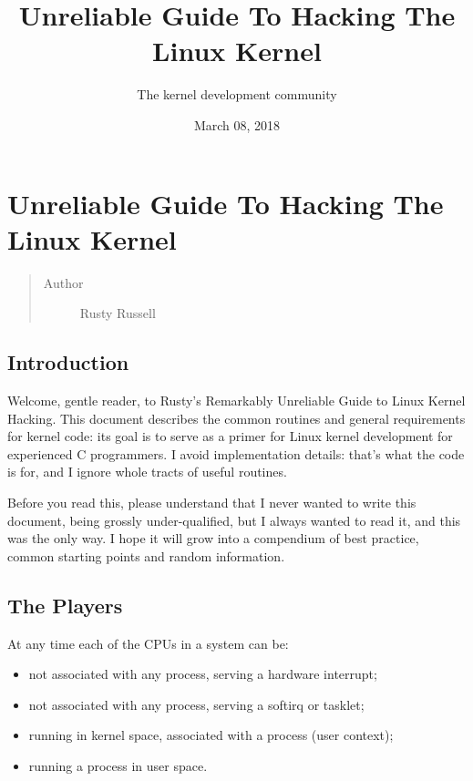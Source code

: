 \documentclass[a4paper,8pt,english]{sphinxmanual}
\title{Unreliable Guide To Hacking The Linux Kernel}
\date{March 08, 2018}
\author{The kernel development community}
\begin{document}
\maketitle
\tableofcontents
{}\label{kernel-hacking/index::doc}



\chapter{Unreliable Guide To Hacking The Linux Kernel}
\label{kernel-hacking/hacking:kernel-hacking-guides}\label{kernel-hacking/hacking::doc}\label{kernel-hacking/hacking:unreliable-guide-to-hacking-the-linux-kernel}\begin{quote}\begin{description}
\item[{Author}] \leavevmode
Rusty Russell

\end{description}\end{quote}


\section{Introduction}
\label{kernel-hacking/hacking:introduction}
Welcome, gentle reader, to Rusty's Remarkably Unreliable Guide to Linux
Kernel Hacking. This document describes the common routines and general
requirements for kernel code: its goal is to serve as a primer for Linux
kernel development for experienced C programmers. I avoid implementation
details: that's what the code is for, and I ignore whole tracts of
useful routines.

Before you read this, please understand that I never wanted to write
this document, being grossly under-qualified, but I always wanted to
read it, and this was the only way. I hope it will grow into a
compendium of best practice, common starting points and random
information.


\section{The Players}
\label{kernel-hacking/hacking:the-players}
At any time each of the CPUs in a system can be:
\begin{itemize}
\item {} 
not associated with any process, serving a hardware interrupt;

\item {} 
not associated with any process, serving a softirq or tasklet;

\item {} 
running in kernel space, associated with a process (user context);

\item {} 
running a process in user space.

\end{itemize}
\end{document}
